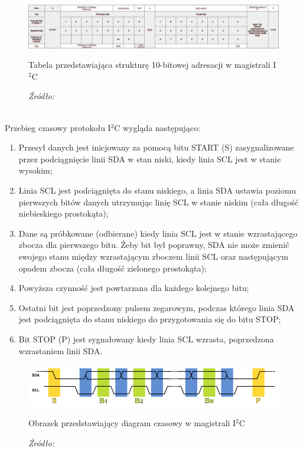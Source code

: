 \documentclass[12pt,a4paper,oneside]{memoir}
\begin{document}
\begin{figure}[!h]
	\centering
	\includegraphics[scale=0.25]{images/i2c-10bit-addresing.png}
	{\tytulyrozdzialow \footnotesize \caption[I$^2$C - Struktura 10-bitowego adresu] {Tabela przedstawiająca strukturę 10-bitowej adresacji w magistrali I$^2$C}}
	\caption*{\textit{Źródło: \cite{i2cwiki}}}
\end{figure}\\
\newpage
Przebieg czasowy protokołu I$^2$C wygląda następująco:
\begin{enumerate}
\item Przesył danych jest inicjowany za pomocą bitu START (S) zasygnalizowane przez podciągnięcie linii SDA w stan niski, kiedy linia SCL jest w stanie wysokim;
\item Linia SCL jest podciągnięta do stanu niskiego, a linia SDA ustawia poziomu pierwszych bitów danych utrzymując linię SCL w stanie niskim (cała długość niebieskiego prostokąta);
\item Dane są próbkowane (odbierane) kiedy linia SCL jest w stanie wzrastającego zbocza dla pierwszego bitu. Żeby bit był poprawny, SDA nie może zmienić swojego stanu między wzrastającym zboczem linii SCL oraz następującym opadem zbocza (cała długość zielonego prostokąta);
\item Powyższa czynność jest powtarzana dla każdego kolejnego bitu;
\item Ostatni bit jest poprzedzony pulsem zegarowym, podczas którego linia SDA jest podciągnięta do stanu niskiego do przygotowania się do bitu STOP;
\item Bit STOP (P) jest sygnałowany kiedy linia SCL wzrasta, poprzedzona wzrastaniem linii SDA.
\end{enumerate}
\begin{figure}[!h]
	\centering
	\includegraphics[scale=0.6]{images/i2c-timing.png}
	{\tytulyrozdzialow \footnotesize \caption[I$^2$C - Diagram czasowy] {Obrazek przedstawiający diagram czasowy w magistrali I$^2$C}}
	\caption*{\textit{Źródło: \cite{i2cwiki}}}
\end{figure}
\newpage
\end{document}
